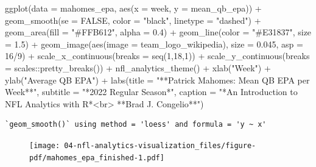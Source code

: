 \documentclass[
  letterpaper,
]{krantz}
\newenvironment{Shaded}{\begin{snugshade}}{\end{snugshade}}
\newcommand{\AttributeTok}[1]{\textcolor[rgb]{0.40,0.45,0.13}{#1}}
\newcommand{\ConstantTok}[1]{\textcolor[rgb]{0.56,0.35,0.01}{#1}}
\newcommand{\DecValTok}[1]{\textcolor[rgb]{0.68,0.00,0.00}{#1}}
\newcommand{\FloatTok}[1]{\textcolor[rgb]{0.68,0.00,0.00}{#1}}
\newcommand{\FunctionTok}[1]{\textcolor[rgb]{0.28,0.35,0.67}{#1}}
\newcommand{\NormalTok}[1]{\textcolor[rgb]{0.00,0.23,0.31}{#1}}
\newcommand{\SpecialCharTok}[1]{\textcolor[rgb]{0.37,0.37,0.37}{#1}}
\newcommand{\StringTok}[1]{\textcolor[rgb]{0.13,0.47,0.30}{#1}}
\begin{document}
\begin{Shaded}
\begin{Highlighting}[]
\FunctionTok{ggplot}\NormalTok{(}\AttributeTok{data =}\NormalTok{ mahomes\_epa, }\FunctionTok{aes}\NormalTok{(}\AttributeTok{x =}\NormalTok{ week, }\AttributeTok{y =}\NormalTok{ mean\_qb\_epa)) }\SpecialCharTok{+}
  \FunctionTok{geom\_smooth}\NormalTok{(}\AttributeTok{se =} \ConstantTok{FALSE}\NormalTok{, }\AttributeTok{color =} \StringTok{"black"}\NormalTok{, }\AttributeTok{linetype =} \StringTok{"dashed"}\NormalTok{) }\SpecialCharTok{+}
  \FunctionTok{geom\_area}\NormalTok{(}\AttributeTok{fill =} \StringTok{"\#FFB612"}\NormalTok{, }\AttributeTok{alpha =} \FloatTok{0.4}\NormalTok{) }\SpecialCharTok{+}
  \FunctionTok{geom\_line}\NormalTok{(}\AttributeTok{color =} \StringTok{"\#E31837"}\NormalTok{, }\AttributeTok{size =} \FloatTok{1.5}\NormalTok{) }\SpecialCharTok{+}
  \FunctionTok{geom\_image}\NormalTok{(}\FunctionTok{aes}\NormalTok{(}\AttributeTok{image =}\NormalTok{ team\_logo\_wikipedia), }\AttributeTok{size =} \FloatTok{0.045}\NormalTok{, }\AttributeTok{asp =} \DecValTok{16}\SpecialCharTok{/}\DecValTok{9}\NormalTok{) }\SpecialCharTok{+}
  \FunctionTok{scale\_x\_continuous}\NormalTok{(}\AttributeTok{breaks =} \FunctionTok{seq}\NormalTok{(}\DecValTok{1}\NormalTok{,}\DecValTok{18}\NormalTok{,}\DecValTok{1}\NormalTok{)) }\SpecialCharTok{+}
  \FunctionTok{scale\_y\_continuous}\NormalTok{(}\AttributeTok{breaks =}\NormalTok{ scales}\SpecialCharTok{::}\FunctionTok{pretty\_breaks}\NormalTok{()) }\SpecialCharTok{+}
  \FunctionTok{nfl\_analytics\_theme}\NormalTok{() }\SpecialCharTok{+}
  \FunctionTok{xlab}\NormalTok{(}\StringTok{"Week"}\NormalTok{) }\SpecialCharTok{+}
  \FunctionTok{ylab}\NormalTok{(}\StringTok{"Average QB EPA"}\NormalTok{) }\SpecialCharTok{+}
  \FunctionTok{labs}\NormalTok{(}\AttributeTok{title =} \StringTok{"**Patrick Mahomes: Mean QB EPA per Week**"}\NormalTok{,}
       \AttributeTok{subtitle =} \StringTok{"*2022 Regular Season*"}\NormalTok{,}
       \AttributeTok{caption =} \StringTok{"*An Introduction to NFL Analytics with R*\textless{}br\textgreater{}}
\StringTok{       **Brad J. Congelio**"}\NormalTok{)}
\end{Highlighting}
\end{Shaded}

\begin{verbatim}
`geom_smooth()` using method = 'loess' and formula = 'y ~ x'
\end{verbatim}

\begin{figure}[H]

{\centering \texttt{[image: 04-nfl-analytics-visualization\_files/figure-pdf/mahomes\_epa\_finished-1.pdf]}

}

\end{figure}
\end{document}
